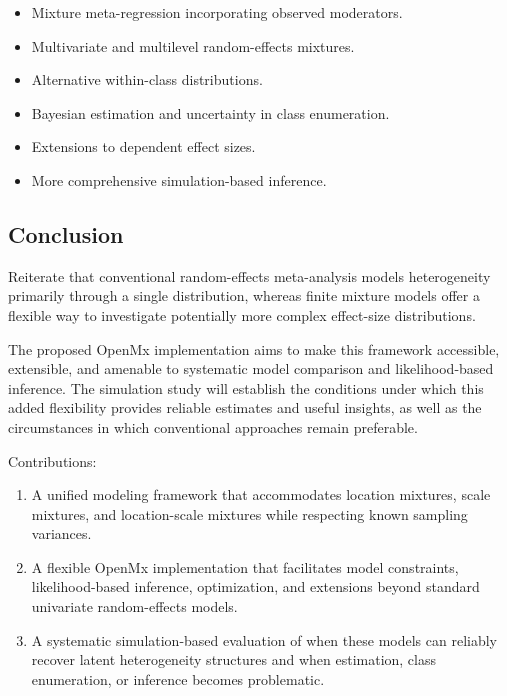 \documentclass[
  english,
  man, noextraspace,floatsintext]{apa6}
\begin{document}
\begin{itemize}
\item
  Mixture meta-regression incorporating observed moderators.
\item
  Multivariate and multilevel random-effects mixtures.
\item
  Alternative within-class distributions.
\item
  Bayesian estimation and uncertainty in class enumeration.
\item
  Extensions to dependent effect sizes.
\item
  More comprehensive simulation-based inference.
\end{itemize}

\subsection{Conclusion}\label{conclusion}

Reiterate that conventional random-effects meta-analysis models heterogeneity primarily through a single distribution, whereas finite mixture models offer a flexible way to investigate potentially more complex effect-size distributions.

The proposed OpenMx implementation aims to make this framework accessible, extensible, and amenable to systematic model comparison and likelihood-based inference. The simulation study will establish the conditions under which this added flexibility provides reliable estimates and useful insights, as well as the circumstances in which conventional approaches remain preferable.

Contributions:

\begin{enumerate}
\def\labelenumi{\arabic{enumi}.}
\item
  A unified modeling framework that accommodates location mixtures, scale mixtures, and location-scale mixtures while respecting known sampling variances.
\item
  A flexible OpenMx implementation that facilitates model constraints, likelihood-based inference, optimization, and extensions beyond standard univariate random-effects models.
\item
  A systematic simulation-based evaluation of when these models can reliably recover latent heterogeneity structures and when estimation, class enumeration, or inference becomes problematic.
\end{enumerate}

\newpage
\end{document}

